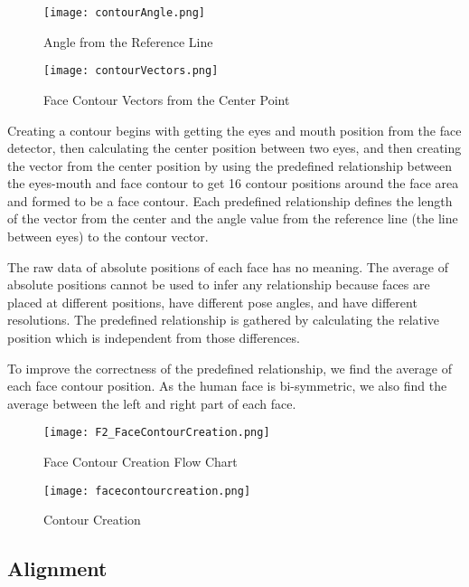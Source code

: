 \begin{figure}[htb]
   \centering
   \texttt{[image: contourAngle.png]}
   \caption{Angle from the Reference Line}
   \label{fig:AngleFromTheReferenceLine}
\end{figure}
\begin{figure}[htb]
   \centering
   \texttt{[image: contourVectors.png]}
   \caption{Face Contour Vectors from the Center Point}
   \label{fig:FaceContourVectorsFromTheCenterPoint}
\end{figure}

Creating a contour begins with getting the eyes and mouth position from the face detector, then calculating the center position between two eyes, and then creating the vector from the center position by using the predefined relationship between the eyes-mouth and face contour to get 16 contour positions around the face area and formed to be a face contour. Each predefined relationship defines the length of the vector from the center and the angle value from the reference line (the line between eyes) to the contour vector.

The raw data of absolute positions of each face has no meaning. The average of absolute positions cannot be used to infer any relationship because faces are placed at different positions, have different pose angles, and have different resolutions. The predefined relationship is gathered by calculating the relative position which is independent from those differences.

To improve the correctness of the predefined relationship, we find the average of each face contour position. As the human face is bi-symmetric, we also find the average between the left and right part of each face.

\begin{figure}[htb]
   \centering
   \texttt{[image: F2\_FaceContourCreation.png]}
   \caption{Face Contour Creation Flow Chart}
   \label{fig:FaceContourCreationFlowchart}
\end{figure}

\begin{figure}[htb]
   \centering
   \texttt{[image: facecontourcreation.png]}
   \caption{Contour Creation}
   \label{fig:ContourCreation}
\end{figure}

\subsection{Alignment}


